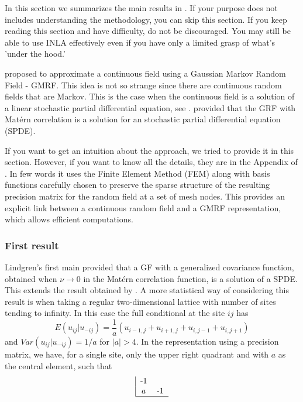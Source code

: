 In this section we summarizes the main results 
in \cite{lindgrenRL:2011}. 
If your purpose does not includes understanding 
the methodology, you can skip this section. 
If you keep reading this section and have difficulty, 
do not be discouraged. You may still be able to use 
INLA effectively even if you have only a limited 
grasp of what's 'under the hood.' 

\cite{rueT:2002} proposed to approximate a continuous 
field using a Gaussian Markov Random Field - GMRF. 
This idea is not so strange since there are 
continuous random fields that are Markov. 
This is the case when the continuous field is a 
solution of a linear stochastic partial 
differential equation, see \cite{rozanov:1977}. 
\cite{lindgrenRL:2011} provided that the 
GRF with Mat\'{e}rn correlation is a solution 
for an stochastic partial differential equation (SPDE). 

If you want to get an intuition about the approach, 
we tried to provide it in this section. 
However, if you want to know all the details, 
they are in the Appendix of \cite{lindgrenRL:2011}. 
In few words it uses the Finite Element Method (FEM)
along with basis functions carefully chosen to 
preserve the sparse structure of the resulting precision 
matrix for the random field at a set of mesh nodes. 
This provides an explicit link between a 
continuous random field and a GMRF representation, 
which allows efficient computations. 

\subsubsection{First result}\label{sec:firstres}

Lindgren's first main provided that a GF with a generalized 
covariance function, obtained when $\nu \rightarrow 0$ in 
the Mat\'ern correlation function, is a solution of a SPDE. 
This extends the result obtained by \cite{besag:1981}. 
A more statistical way of considering this result is when 
taking a regular two-dimensional lattice with number of 
sites tending to infinity. 
In this case the full conditional at the site $ij$ has 
\begin{equation}
E(u_{ij}|u_{-ij}) = \frac{1}{a}(u_{i-1,j}+u_{i+1,j}+u_{i,j-1}+u_{i,j+1})
\end{equation}
and $Var(u_{ij}|u_{-ij}) = 1/a$ for $|a|>4$. 
In the representation using a precision matrix, 
we have, for a single site, only the upper right 
quadrant and with $a$ as the central element, such that 
\begin{equation}\label{eq:q0}
\begin{tabular}{|cc} 
-1  & \\
$a$ & -1 \\
\hline
\end{tabular}
\end{equation}

